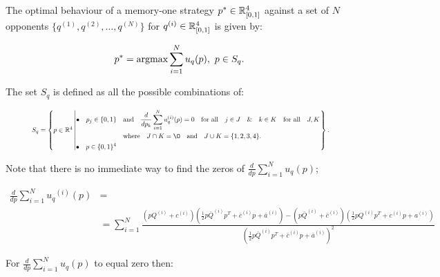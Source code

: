 \begin{theorem}\label{theorem:memone_group_best_response}

    The optimal behaviour of a memory-one strategy
    \(p^* \in \mathbb{R}_{[0, 1]} ^ 4\)
    against a set of \(N\) opponents \(\{q^{(1)}, q^{(2)}, \dots, q^{(N)} \}\)
    for \(q^{(i)} \in \mathbb{R}_{[0, 1]} ^ 4\) is given by:

    \[p^* = \textnormal{argmax}\sum\limits_{i=1} ^ N  u_q(p), \ p \in S_q.\]

    The set \(S_q\) is defined as all the possible combinations of:

    \begin{equation}\label{eq:s_q_set}
        \resizebox{.9\linewidth}{!}{ $
        S_q =
        \left\{p \in \mathbb{R} ^ 4 \left|
            \begin{aligned}
                \bullet\quad p_j \in \{0, 1\} & \quad \text{and} \quad \frac{d}{dp_k} 
                \sum\limits_{i=1} ^ N  u_q^{(i)}(p) = 0
                \quad \text{for all} \quad j \in J \quad \&  \quad k \in K  \quad \text{for all} \quad J, K \\
                & \quad \text{where} \quad J \cap K = \O \quad
                \text{and} \quad J \cup K = \{1, 2, 3, 4\}.\\
                \bullet\quad  p \in \{0, 1\} ^ 4
            \end{aligned}\right.
        \right\}.
        $}
    \end{equation}
\end{theorem}



Note that there is no immediate way to find the zeros of \(\frac{d}{dp} \sum\limits_{i=1} ^ N  u_q(p)\);

{\footnotesize
\begin{align}\label{eq:mo_tournament_derivative}
    \frac{d}{dp} \sum\limits_{i=1} ^ {N} {u_q}^{(i)} (p) & = \nonumber \\
    & =  \displaystyle\sum\limits_{i=1} ^ {N}
    \frac{\left(pQ^{(i)} + c^{(i)}\right) \left(\frac{1}{2} p\bar{Q}^{(i)} p^T + \bar{c}^{(i)} p + \bar{a}^ {(i)}\right)
    - \left(p\bar{Q}^{(i)} + \bar{c}^{(i)}\right) \left(\frac{1}{2} pQ^{(i)} p^T + c^{(i)} p + a^ {(i)}\right)}
    {\left(\frac{1}{2} p\bar{Q}^{(i)} p^T + \bar{c}^{(i)} p + \bar{a}^ {(i)}\right)^ 2}
\end{align}
}

For \(\frac{d}{dp} \sum\limits_{i=1} ^ N  u_q(p)\) to equal zero then:

